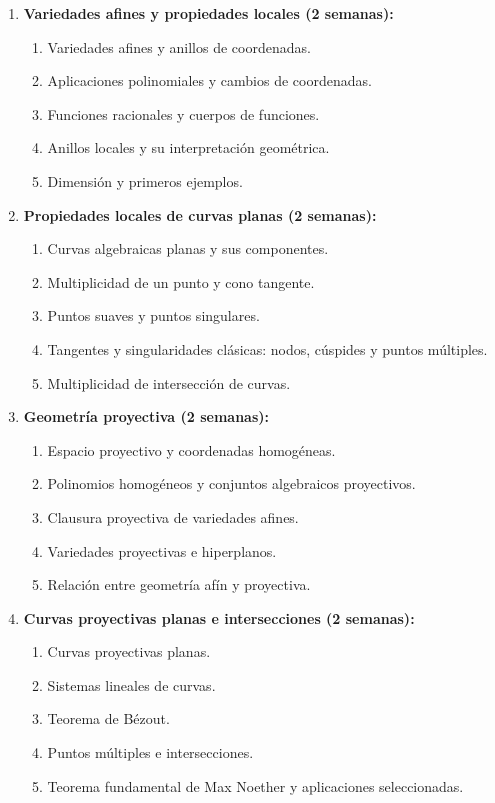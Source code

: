 \begin{refsection}
\begin{enumerate}
\item \textbf{Variedades afines y propiedades locales (2 semanas):}
\begin{enumerate}
\item Variedades afines y anillos de coordenadas.
\item Aplicaciones polinomiales y cambios de coordenadas.
\item Funciones racionales y cuerpos de funciones.
\item Anillos locales y su interpretación geométrica.
\item Dimensión y primeros ejemplos.
\end{enumerate}

\item \textbf{Propiedades locales de curvas planas (2 semanas):}
\begin{enumerate}
\item Curvas algebraicas planas y sus componentes.
\item Multiplicidad de un punto y cono tangente.
\item Puntos suaves y puntos singulares.
\item Tangentes y singularidades clásicas: nodos, cúspides y puntos múltiples.
\item Multiplicidad de intersección de curvas.
\end{enumerate}

\item \textbf{Geometría proyectiva (2 semanas):}
\begin{enumerate}
\item Espacio proyectivo y coordenadas homogéneas.
\item Polinomios homogéneos y conjuntos algebraicos proyectivos.
\item Clausura proyectiva de variedades afines.
\item Variedades proyectivas e hiperplanos.
\item Relación entre geometría afín y proyectiva.
\end{enumerate}

\item \textbf{Curvas proyectivas planas e intersecciones (2 semanas):}
\begin{enumerate}
\item Curvas proyectivas planas.
\item Sistemas lineales de curvas.
\item Teorema de Bézout.
\item Puntos múltiples e intersecciones.
\item Teorema fundamental de Max Noether y aplicaciones seleccionadas.
\end{enumerate}


\end{enumerate}
\end{refsection}
